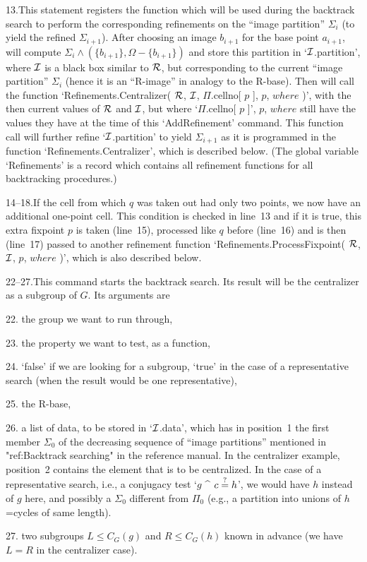 13.\enspace This   statement registers the  function   which will be used
during the  backtrack search to  perform the corresponding refinements on
the ``image partition'' $\Sigma_i$ (to yield the refined $\Sigma_{i+1}$).
After  choosing an image $b_{i+1}$  for the base  point $a_{i+1}$, {\GAP}
will compute $\Sigma_i \wedge (\{b_{i+1}\},\Omega-\{b_{i+1}\})$ and store
this partition  in `$\cal I$.partition', where  $\cal  I$ is a  black box
similar to $\cal R$, but corresponding to the current ``image partition''
$\Sigma_i$ (hence  it is an ``R-image'' in  analogy to the  R-base). Then
{\GAP} will call the  function `Refinements.Centralizer( $\cal  R$, $\cal
I$, $\Pi$.cellno[ $p$ ], $p$, $where$ )', with the then current values of
$\cal R$  and  $\cal I$, but  where `$\Pi$.cellno[  $p$  ]', $p$, $where$
still have  the values  they have  at  the  time of this  `AddRefinement'
command. This function call  will further refine `$\cal  I$.partition' to
yield    $\Sigma_{i+1}$  as   it     is  programmed  in    the   function
`Refinements.Centralizer', which is described below. (The global variable
`Refinements' is a record which contains all refinement functions for all
backtracking procedures.)

14--18.\enspace If the cell  from which $q$  was  taken out had  only two
points,  we  now have an additional   one-point  cell. This  condition is
checked in line~13 and  if it is true,  this extra fixpoint $p$  is taken
(line~15),  processed like $q$ before   (line~16) and  is then  (line~17)
passed to another refinement function `Refinements.ProcessFixpoint( $\cal
R$, $\cal I$, $p$, $where$ )', which is also described below.

22--27.\enspace This command starts the backtrack search. Its result will
be the centralizer as a subgroup of $G$. Its arguments are
\beginlist
  \item{22.} the group we want to run through,
  \item{23.} the property we want to test, as a {\GAP} function,
  \item{24.} `false' if we are looking for a subgroup, `true' in the case
    of   a  representative  search    (when  the result   would    be one
    representative),
  \item{25.} the R-base,
  \item{26.} a list  of data, to be stored  in `$\cal I$.data', which has
    in position~1 the first member $\Sigma_0$  of the decreasing sequence
    of ``image partitions'' mentioned in "ref:Backtrack searching" in the
    reference manual. In the centralizer example, position~2 contains the
    element that is  to be centralized. In the  case of  a representative
    search,  i.e.,  a conjugacy test  `$g$  ^ $c \buildrel?\over= h$', we
    would  have $h$   instead of  $g$   here, and   possibly a $\Sigma_0$
    different from $\Pi_0$ (e.g., a  partition into unions of  $h$=cycles
    of same length).
  \item{27.} two subgroups  $L\le  C_G(g)$  and  $R\le  C_G(h)$ known  in
    advance (we have $L=R$ in the centralizer case).
\endlist

